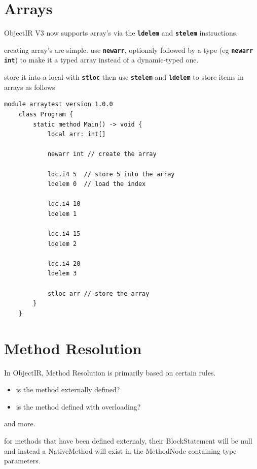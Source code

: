\documentclass[11pt,a4paper]{article}
\newcommand{\opcode}[1]{\textbf{\texttt{#1}}}
\begin{document}
\appendix


\section{Arrays}
\label{sec:arrays}
ObjectIR V3 now supports array's via the \opcode{ldelem} and \opcode{stelem} instructions.

creating array's are simple.
use \opcode{newarr}, optionaly followed by a type (eg \opcode{newarr int}) to make it a typed array instead of a dynamic-typed one.

store it into a local with \opcode{stloc}
then use \opcode{stelem} and \opcode{ldelem} to store items in arrays as follows

\begin{lstlisting}[style=textir, caption={array example}]
	module arraytest version 1.0.0
	class Program {
		static method Main() -> void {
			local arr: int[]
			
			newarr int // create the array
			
			ldc.i4 5  // store 5 into the array
			ldelem 0  // load the index
			
			ldc.i4 10 
			ldelem 1 
			
			ldc.i4 15 
			ldelem 2
			
			ldc.i4 20 
			ldelem 3 
			
			stloc arr // store the array
		}
	}
\end{lstlisting}


\section{Method Resolution}
\label{sec:methodresolution}

In ObjectIR, Method Resolution is primarily based on certain rules.

\begin{itemize}
	\item is the method externally defined?
	\item is the method defined with overloading?
	\end{itemize}
	and more.
	
	for methods that have been defined externaly, their BlockStatement will be null and instead a NativeMethod will exist in the MethodNode containing type parameters.
	
\end{document}
